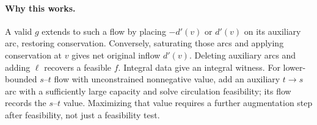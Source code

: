 \documentclass[10pt]{article}
\theoremstyle{definition}
\begin{document}
\paragraph{Why this works.}
A valid $g$ extends to such a flow by placing $-d'(v)$ or $d'(v)$ on its
auxiliary arc, restoring conservation. Conversely, saturating those arcs
and applying conservation at $v$ gives net original inflow $d'(v)$.
Deleting auxiliary arcs and adding $\ell$ recovers a feasible $f$.
Integral data give an integral witness. For lower-bounded $s$--$t$ flow with
unconstrained nonnegative value, add an auxiliary $t\to s$ arc with a
sufficiently large capacity and solve circulation feasibility; its flow
records the $s$--$t$ value. Maximizing that value requires a further
augmentation step after feasibility, not just a feasibility test.
\end{document}

